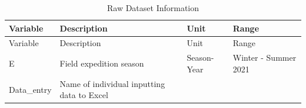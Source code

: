 \documentclass[
  12pt,
]{article}
\begin{document}
\begin{longtable}[]{@{}llll@{}}
\caption{Raw Dataset Information}\tabularnewline
\toprule
\begin{minipage}[b]{0.13\columnwidth}\raggedright
Variable\strut
\end{minipage} & \begin{minipage}[b]{0.37\columnwidth}\raggedright
Description\strut
\end{minipage} & \begin{minipage}[b]{0.19\columnwidth}\raggedright
Unit\strut
\end{minipage} & \begin{minipage}[b]{0.20\columnwidth}\raggedright
Range\strut
\end{minipage}\tabularnewline
\midrule
\endfirsthead
\toprule
\begin{minipage}[b]{0.13\columnwidth}\raggedright
Variable\strut
\end{minipage} & \begin{minipage}[b]{0.37\columnwidth}\raggedright
Description\strut
\end{minipage} & \begin{minipage}[b]{0.19\columnwidth}\raggedright
Unit\strut
\end{minipage} & \begin{minipage}[b]{0.20\columnwidth}\raggedright
Range\strut
\end{minipage}\tabularnewline
\midrule
\endhead
\begin{minipage}[t]{0.13\columnwidth}\raggedright
E\strut
\end{minipage} & \begin{minipage}[t]{0.37\columnwidth}\raggedright
Field expedition season\strut
\end{minipage} & \begin{minipage}[t]{0.19\columnwidth}\raggedright
Season-Year\strut
\end{minipage} & \begin{minipage}[t]{0.20\columnwidth}\raggedright
Winter - Summer 2021\strut
\end{minipage}\tabularnewline
\begin{minipage}[t]{0.13\columnwidth}\raggedright
Data\_entry\strut
\end{minipage} & \begin{minipage}[t]{0.37\columnwidth}\raggedright
Name of individual inputting data to Excel\strut
\end{minipage} & \begin{minipage}[t]{0.19\columnwidth}\raggedright

\end{minipage}
\end{longtable}
\end{document}
